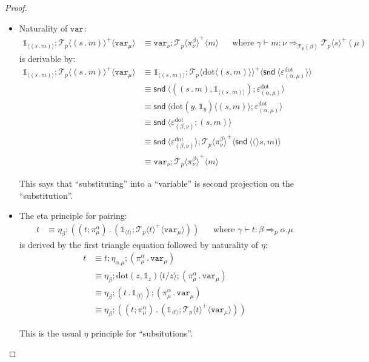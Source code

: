 \documentclass[10pt]{article}
\theoremstyle{definition}
\newcommand\dsd[1]{\ensuremath{\mathsf{#1}}}
\newcommand{\tcell}{\Rightarrow}
\newcommand{\app}[2]{\ensuremath{#1 \: #2}}
\newcommand{\snd}[1]{\app{\dsd{snd}}{#1}}
\newcommand\TermTwoT[5]{\ensuremath{#1 \vdash {#2} : #3 \tcell_{#5} #4}}
\newcommand\TrPlus[2]{\ensuremath{{#1}^+(#2)}}
\newcommand\El[2]{\mathcal{T}_{#1}(#2)}
\newcommand\ApEl[2]{\mathcal{T}_{#1}\langle#2\rangle}
\newcommand\bdot[0]{\mathbin{.}}
\newcommand\ap[2]{\ensuremath{#1 \langle #2 \rangle }}
\newcommand\ApPlus[2]{\ensuremath{{#1}^+ \langle #2 \rangle }}
\newcommand{\tdot}{\ensuremath{\mathtt{dot}}}
\newcommand{\sdot}{\ensuremath{\mathrm{dot}}}
\newcommand\One{\ensuremath{\mathds{1}}}
\newcommand\var[1]{\ensuremath{\mathtt{var}_{#1}}}
\newcommand\ApOne[1]{\ensuremath{\One_{\langle {#1} \rangle }}}
\begin{document}
\begin{proof}
\begin{itemize}
\item Naturality of $\var{}$:
\begin{align}
\label{beta-var}
\ApOne{(s \bdot m)};\ApPlus{\ApEl{p}{(s \bdot m)}}{\var{\mu}} &\equiv \var{\nu};\ApPlus{\ApEl{p}{\pi^\beta_\nu}}{m}  && \text{where } \TermTwoT{\gamma}{m}{\nu}{\TrPlus{\ApEl{p}{s}}{\mu}}{\El{p}{\beta}}
\end{align}
is derivable by:
\begin{align*}
\ApOne{(s \bdot m)};\ApPlus{\ApEl{p}{(s \bdot m)}}{\var{\mu}} 
&\equiv \ApOne{(s \bdot m)};\ApPlus{\ApEl{p}{\ap{\sdot}{(s, m)}}}{\ap \snd {\varepsilon^\sdot_{(\alpha, \mu)}}} \\
&\equiv \ap \snd {((s \bdot m), \ApOne{(s \bdot m)});\varepsilon^\sdot_{(\alpha, \mu)}} \\
&\equiv \ap \snd {\ap{\sdot(y,\One_y)}{(s, m)};\varepsilon^\sdot_{(\alpha, \mu)}} \\
&\equiv \ap \snd {\varepsilon^\sdot_{(\beta, \nu)};(s, m)} \\
&\equiv \ap \snd {\varepsilon^\sdot_{(\beta, \nu)}}; \ApPlus{\ApEl{p}{\pi^\beta_{\nu}}}{\ap \snd (s, m)}  \\
&\equiv \var{\nu}; \ApPlus{\ApEl{p}{\pi^\beta_{\nu}}}{m} 
\end{align*}

This says that ``substituting'' into a ``variable'' is second projection
on the ``substitution''.

\item The eta principle for pairing:
\begin{align}
\label{eta-pi-var}
t &\equiv \eta_\beta;((t;\pi_\mu^\alpha) \bdot (\ApOne{t}; \ApPlus{\ApEl{p}{t}}{\var{\mu}})) && \text{where } \TermTwoT{\gamma}{t}{\beta}{\alpha.\mu}{p}
\end{align}
is derived by the first triangle equation followed by naturality of $\eta$:
\begin{align*}
t &\equiv t;\eta_{\alpha.\mu};(\pi_\mu^\alpha \bdot \var{\mu}) \\
&\equiv \eta_\beta;\ap{\sdot(z,\One_z)}{t/z};(\pi_\mu^\alpha \bdot \var{\mu}) \\
&\equiv \eta_\beta;(t \bdot \ApOne{t});(\pi_\mu^\alpha \bdot \var{\mu}) \\
&\equiv \eta_\beta;((t;\pi_\mu^\alpha) \bdot (\ApOne{t}; \ApPlus{\ApEl{p}{t}}{\var{\mu}}))
\end{align*}

This is the usual $\eta$ principle for ``subsitutions''.

%

\end{itemize}
\end{proof}
\end{document}

